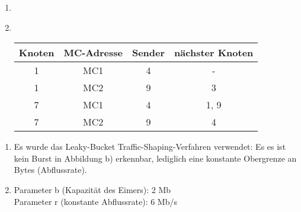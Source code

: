 \documentclass[12pt]{scrartcl}
\begin{document}
\setcounter{exnum}{1}
    \begin{enumerate}[label=(\alph*)]
        \item \ \\
        \item \ \\
            \begin{tabular}{c|c|c|c}
            Knoten & MC-Adresse & Sender & nächster Knoten \\
            \hline
            1 & MC1 & 4 & - \\
            1 & MC2 & 9 & 3 \\
            \hline
            7 & MC1 & 4 & 1, 9 \\
            7 & MC2 & 9 & 4 \\
            \hline
            \end{tabular}
    \end{enumerate}
 
\setcounter{exnum}{2}
    \begin{enumerate}[label=(\alph*)]
        \item Es wurde das Leaky-Bucket Traffic-Shaping-Verfahren verwendet: Es es ist kein Burst in Abbildung b) erkennbar,
        lediglich eine konstante Obergrenze an Bytes (Abflussrate).
        \item Parameter b (Kapazität des Eimers): 2 Mb\\
        Parameter r (konstante Abflussrate): 6 Mb/s
    \end{enumerate}
\end{document}
